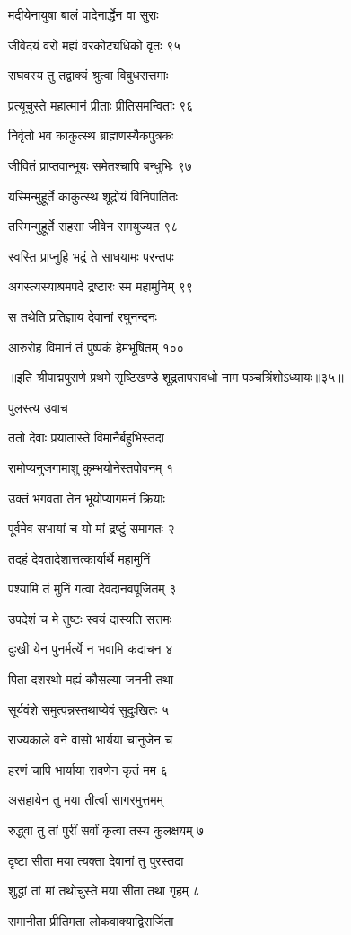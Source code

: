 मदीयेनायुषा बालं पादेनार्द्धेन वा सुराः

जीवेदयं वरो मह्यं वरकोट्यधिको वृतः ९५

राघवस्य तु तद्वाक्यं श्रुत्वा विबुधसत्तमाः

प्रत्यूचुस्ते महात्मानं प्रीताः प्रीतिसमन्विताः ९६

निर्वृतो भव काकुत्स्थ ब्राह्मणस्यैकपुत्रकः

जीवितं प्राप्तवान्भूयः समेतश्चापि बन्धुभिः ९७

यस्मिन्मुहूर्ते काकुत्स्थ शूद्रोयं विनिपातितः

तस्मिन्मुहूर्ते सहसा जीवेन समयुज्यत ९८

स्वस्ति प्राप्नुहि भद्रं ते साधयामः परन्तपः

अगस्त्यस्याश्रमपदे द्रष्टारः स्म महामुनिम् ९९

स तथेति प्रतिज्ञाय देवानां रघुनन्दनः

आरुरोह विमानं तं पुष्पकं हेमभूषितम् १००

॥इति श्रीपाद्मपुराणे प्रथमे सृष्टिखण्डे शूद्रतापसवधो नाम पञ्चत्रिंशोऽध्यायः॥३५॥


पुलस्त्य उवाच

ततो देवाः प्रयातास्ते विमानैर्बहुभिस्तदा

रामोप्यनुजगामाशु कुम्भयोनेस्तपोवनम् १

उक्तं भगवता तेन भूयोप्यागमनं क्रियाः

पूर्वमेव सभायां च यो मां द्रष्टुं समागतः २

तदहं देवतादेशात्तत्कार्यार्थे महामुनिं

पश्यामि तं मुनिं गत्वा देवदानवपूजितम् ३

उपदेशं च मे तुष्टः स्वयं दास्यति सत्तमः

दुःखी येन पुनर्मर्त्ये न भवामि कदाचन ४

पिता दशरथो मह्यं कौसल्या जननी तथा

सूर्यवंशे समुत्पन्नस्तथाप्येवं सुदुःखितः ५

राज्यकाले वने वासो भार्यया चानुजेन च

हरणं चापि भार्याया रावणेन कृतं मम ६

असहायेन तु मया तीर्त्वा सागरमुत्तमम्

रुद्ध्वा तु तां पुरीं सर्वां कृत्वा तस्य कुलक्षयम् ७

दृष्टा सीता मया त्यक्ता देवानां तु पुरस्तदा

शुद्धां तां मां तथोचुस्ते मया सीता तथा गृहम् ८

समानीता प्रीतिमता लोकवाक्याद्विसर्जिता

